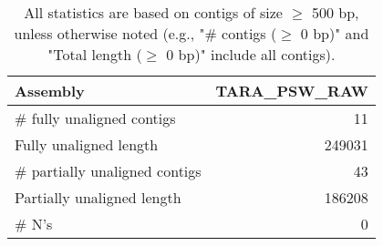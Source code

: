 \documentclass[12pt,a4paper]{article}
\begin{document}
\begin{table}[ht]
\begin{center}
\caption{All statistics are based on contigs of size $\geq$ 500 bp, unless otherwise noted (e.g., "\# contigs ($\geq$ 0 bp)" and "Total length ($\geq$ 0 bp)" include all contigs).}
\begin{tabular}{|l*{1}{|r}|}
\hline
Assembly & TARA\_PSW\_RAW \\ \hline
\# fully unaligned contigs & 11 \\ \hline
Fully unaligned length & 249031 \\ \hline
\# partially unaligned contigs & 43 \\ \hline
Partially unaligned length & 186208 \\ \hline
\# N's & 0 \\ \hline
\end{tabular}
\end{center}
\end{table}
\end{document}
